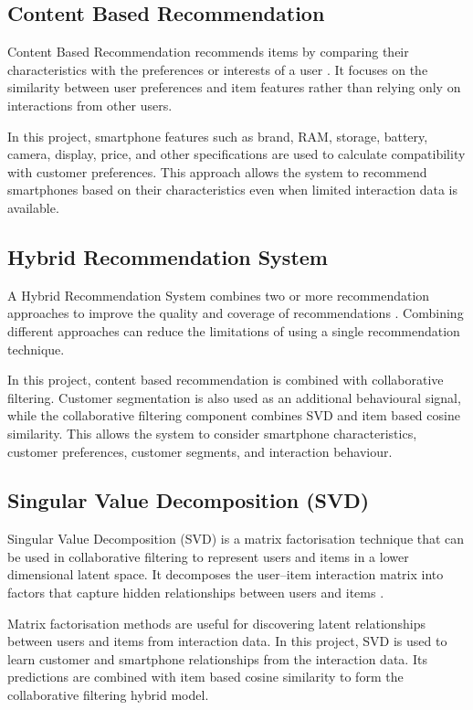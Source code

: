 \documentclass[12pt]{report}
\numberwithin{figure}{chapter}
\numberwithin{table}{chapter}
\numberwithin{equation}{chapter}
\begin{document}
\subsection{Content Based Recommendation}

Content Based Recommendation recommends items by comparing their characteristics with the preferences or interests of a user \cite{pazzani}. It focuses on the similarity between user preferences and item features rather than relying only on interactions from other users.

In this project, smartphone features such as brand, RAM, storage, battery, camera, display, price, and other specifications are used to calculate compatibility with customer preferences. This approach allows the system to recommend smartphones based on their characteristics even when limited interaction data is available.

\subsection{Hybrid Recommendation System}

A Hybrid Recommendation System combines two or more recommendation approaches to improve the quality and coverage of recommendations \cite{burke}. Combining different approaches can reduce the limitations of using a single recommendation technique.

In this project, content based recommendation is combined with collaborative filtering. Customer segmentation is also used as an additional behavioural signal, while the collaborative filtering component combines SVD and item based cosine similarity. This allows the system to consider smartphone characteristics, customer preferences, customer segments, and interaction behaviour.

\subsection{Singular Value Decomposition (SVD)}

Singular Value Decomposition (SVD) is a matrix factorisation technique that can be used in collaborative filtering to represent users and items in a lower dimensional latent space. It decomposes the user--item interaction matrix into factors that capture hidden relationships between users and items \cite{sarwar}.

Matrix factorisation methods are useful for discovering latent relationships between users and items from interaction data. In this project, SVD is used to learn customer and smartphone relationships from the interaction data. Its predictions are combined with item based cosine similarity to form the collaborative filtering hybrid model.
\end{document}
